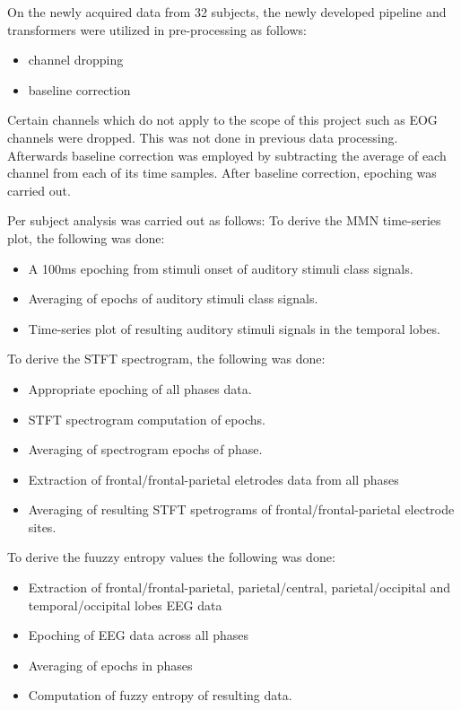 \documentclass[conference]{IEEEconf}
\begin{document}
On the newly acquired data from 32 subjects, the newly developed pipeline and transformers were utilized in pre-processing as follows:
\begin{itemize}
  \item channel dropping
  \item baseline correction
\end{itemize}
Certain channels which do not apply to the scope of this project such as EOG channels were dropped. This was not done in previous data processing. Afterwards baseline
correction was employed by subtracting the average of each channel from each of its time samples. After baseline correction, epoching was carried out.

Per subject analysis was carried out as follows:
To derive the MMN time-series plot, the following was done:
\begin{itemize}
  \item A 100ms epoching from stimuli onset of auditory stimuli class signals.
  \item Averaging of epochs of auditory stimuli class signals.
  \item Time-series plot of resulting auditory stimuli signals in the temporal lobes.
\end{itemize}
To derive the STFT spectrogram, the following was done:
\begin{itemize}
  \item Appropriate epoching of all phases data.
  \item STFT spectrogram computation of epochs.
  \item Averaging of spectrogram epochs of phase.
  \item Extraction of frontal/frontal-parietal eletrodes data from all phases
  \item Averaging of resulting STFT spetrograms of frontal/frontal-parietal electrode sites.
\end{itemize}
To derive the fuuzzy entropy values the following was done:
\begin{itemize}
  \item Extraction of frontal/frontal-parietal, parietal/central, parietal/occipital and temporal/occipital lobes EEG data
  \item Epoching of EEG data across all phases
  \item Averaging of epochs in phases
  \item Computation of fuzzy entropy of resulting data.
\end{itemize}
\end{document}
